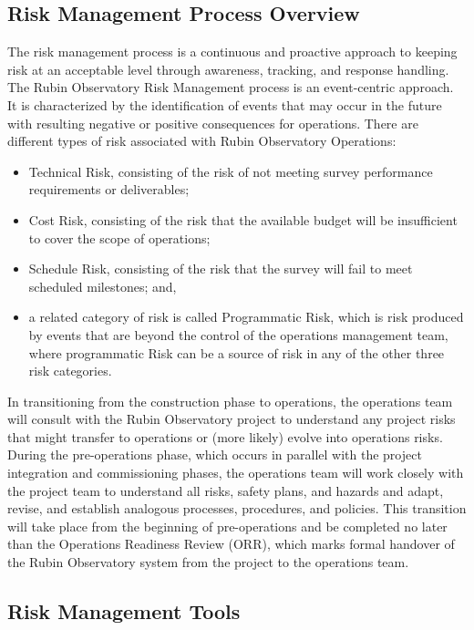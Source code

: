 \subsection{Risk Management Process Overview}

The risk management process is a continuous and proactive approach to keeping risk at an acceptable level through awareness, tracking, and response handling.
The Rubin Observatory Risk Management process is an event-centric approach.
It is characterized by the identification of events that may occur in the future with resulting negative or positive consequences for operations.
There are different types of risk associated with Rubin Observatory Operations:
\begin{itemize}
\item Technical Risk, consisting of the risk of not meeting survey performance requirements or deliverables;
\item Cost Risk, consisting of the risk that the available budget will be insufficient to cover the scope of operations;
\item Schedule Risk, consisting of the risk that the survey will fail to meet scheduled milestones; and,
\item a related category of risk is called Programmatic Risk, which is risk produced by events that are beyond the control of the operations management team, where programmatic Risk can be a source of risk in any of the other three risk categories. 
\end{itemize}

In transitioning from the construction phase to operations, the operations team will consult with the Rubin Observatory project to understand any project risks that might transfer to operations or (more likely) evolve into operations risks.
During the pre-operations phase, which occurs in parallel with the project integration and commissioning phases, the operations team will work closely with the project team to understand all risks, safety plans, and hazards and adapt, revise, and establish analogous processes, procedures, and policies.
This transition will take place from the beginning of pre-operations and be completed no later than the Operations Readiness Review (ORR), which marks formal handover of the Rubin Observatory system from the project to the operations team.

\subsection{Risk Management Tools}

